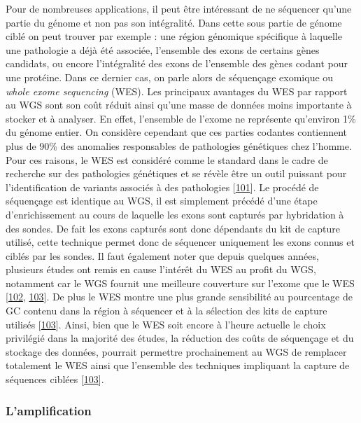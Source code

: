 \documentclass[12pt,twoside]{reedthesis}
\theoremstyle{definition}
\theoremstyle{definition}
\theoremstyle{remark}
\begin{document}
  Pour de nombreuses applications, il peut être intéressant de ne
  séquencer qu'une partie du génome et non pas son intégralité. Dans cette
  sous partie de génome ciblé on peut trouver par exemple : une région
  génomique spécifique à laquelle une pathologie a déjà été associée,
  l'ensemble des exons de certains gènes candidats, ou encore
  l'intégralité des exons de l'ensemble des gènes codant pour une
  protéine. Dans ce dernier cas, on parle alors de séquençage exomique ou
  \emph{whole exome sequencing} (WES). Les principaux avantages du WES par
  rapport au WGS sont son coût réduit ainsi qu'une masse de données moins
  importante à stocker et à analyser. En effet, l'ensemble de l'exome ne
  représente qu'environ 1\% du génome entier. On considère cependant que
  ces parties codantes contiennent plus de 90\% des anomalies responsables
  de pathologies génétiques chez l'homme. Pour ces raisons, le WES est
  considéré comme le standard dans le cadre de recherche sur des
  pathologies génétiques et se révèle être un outil puissant pour
  l'identification de variants associés à des pathologies
  {[}\protect\hyperlink{ref-Ng2010}{101}{]}. Le procédé de séquençage est
  identique au WGS, il est simplement précédé d'une étape d'enrichissement
  au cours de laquelle les exons sont capturés par hybridation à des
  sondes. De fait les exons capturés sont donc dépendants du kit de
  capture utilisé, cette technique permet donc de séquencer uniquement les
  exons connus et ciblés par les sondes. Il faut également noter que
  depuis quelques années, plusieurs études ont remis en cause l'intérêt du
  WES au profit du WGS, notamment car le WGS fournit une meilleure
  couverture sur l'exome que le WES
  {[}\protect\hyperlink{ref-Lelieveld2015}{102},
  \protect\hyperlink{ref-Meienberg2016}{103}{]}. De plus le WES montre une
  plus grande sensibilité au pourcentage de GC contenu dans la région à
  séquencer et à la sélection des kits de capture utilisés
  {[}\protect\hyperlink{ref-Meienberg2016}{103}{]}. Ainsi, bien que le WES
  soit encore à l'heure actuelle le choix privilégié dans la majorité des
  études, la réduction des coûts de séquençage et du stockage des données,
  pourrait permettre prochainement au WGS de remplacer totalement le WES
  ainsi que l'ensemble des techniques impliquant la capture de séquences
  ciblées {[}\protect\hyperlink{ref-Meienberg2016}{103}{]}.
  
  \subsubsection{L'amplification}\label{lamplification}
  
\end{document}
